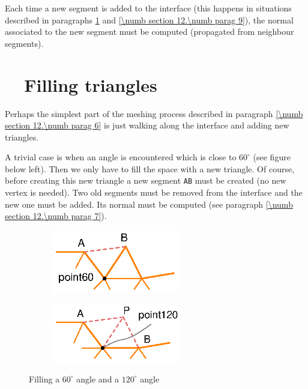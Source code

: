 Each time a new segment is added to the interface (this happens in situations described in
paragraphs \ref{\numb section 12.\numb parag 8} and \ref{\numb section 12.\numb parag 9}),
the normal associated to the new segment must be computed (propagated from neighbour
segments).


\section{~~Filling triangles}\label{\numb section 12.\numb parag 8}

Perhaps the simplest part of the meshing process described in paragraph
\ref{\numb section 12.\numb parag 6} is just walking along the interface and
adding new triangles.

A trivial case is when an angle is encountered which is close to $ 60^\circ $
(see figure below left).
Then we only have to fill the space with a new triangle.
Of course, before creating this new triangle a new segment {\small\tt AB} must be created
(no new vertex is needed).
Two old segments must be removed from the interface and the new one must be added.
Its normal must be computed (see paragraph \ref{\numb section 12.\numb parag 7}).

\begin{figure}[ht] \centering
\begin{subfigure}{71mm}\centering
  \includegraphics[width=55mm]{fill-angle-60}
\end{subfigure}  
\begin{subfigure}{71mm}\centering
  \includegraphics[width=55mm]{fill-angle-120}
\end{subfigure}  
  \caption{Filling a $ 60^\circ $ angle and a $ 120^\circ $ angle}
  \label{\numb section 12.\numb fig 4}
\end{figure}

